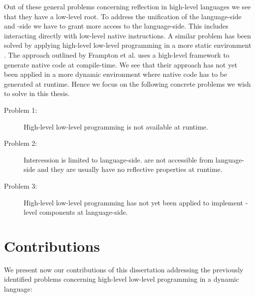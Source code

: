 \noindent Out of these general problems concerning reflection in high-level languages we see that they have a low-level root.
To address the unification of the language-side and \VM-side we have to grant more access to the language-side.
This includes interacting directly with low-level native instructions.
A similar problem has been solved by applying high-level low-level programming in a more static environment \cite{Fram09a}.
The approach outlined by Frampton et al. uses a high-level framework to generate native code at compile-time.
We see that their approach has not yet been applied in a more dynamic environment where native code has to be generated at runtime.
Hence we focus on the following concrete problems we wish to solve in this thesis.

\begin{description}
	\item[Problem 1:] High-level low-level programming is not available at runtime.
	
	\item[Problem 2:] Intercession is limited to language-side.
	\VMs are not accessible from language-side and they are usually have no reflective properties at runtime.
	
	\item[Problem 3:] High-level low-level programming has not yet been applied to implement \VM-level components at language-side.
\end{description}


\section{Contributions}

We present now our contributions of this dissertation addressing the previously identified problems concerning high-level low-level programming in a dynamic language:

